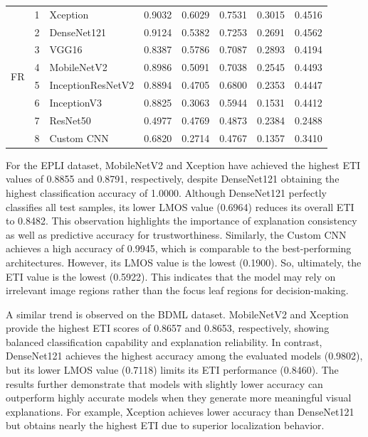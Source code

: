 \documentclass[a4paper,fleqn]{cas-dc}
\begin{document}
\begin{table}[htbp]
{\begin{tabular}{|l|c|l|c|c|c|c|c|}
\multirow{8}{*}{FR}
&1&Xception&0.9032&0.6029&0.7531&0.3015&0.4516\\
&2&DenseNet121&0.9124&0.5382&0.7253&0.2691&0.4562\\
&3&VGG16&0.8387&0.5786&0.7087&0.2893&0.4194\\
&4&MobileNetV2&0.8986&0.5091&0.7038&0.2545&0.4493\\
&5&InceptionResNetV2&0.8894&0.4705&0.6800&0.2353&0.4447\\
&6&InceptionV3&0.8825&0.3063&0.5944&0.1531&0.4412\\
&7&ResNet50&0.4977&0.4769&0.4873&0.2384&0.2488\\
&8&Custom CNN&0.6820&0.2714&0.4767&0.1357&0.3410\\

\hline
\end{tabular}}
\end{table}



For the EPLI dataset, MobileNetV2 and Xception have achieved the highest ETI values of 0.8855 and 0.8791, respectively, despite DenseNet121 obtaining the highest classification accuracy of 1.0000. Although DenseNet121 perfectly classifies all test samples, its lower LMOS value (0.6964) reduces its overall ETI to 0.8482. This observation highlights the importance of explanation consistency as well as predictive accuracy for trustworthiness. Similarly, the Custom CNN achieves a high accuracy of 0.9945, which is comparable to the best-performing architectures. However, its LMOS value is the lowest (0.1900). So, ultimately, the ETI value is the lowest (0.5922). This indicates that the model may rely on irrelevant image regions rather than the focus leaf regions for decision-making.

A similar trend is observed on the BDML dataset. MobileNetV2 and Xception provide the highest ETI scores of 0.8657 and 0.8653, respectively, showing balanced classification capability and explanation reliability. In contrast, DenseNet121 achieves the highest accuracy among the evaluated models (0.9802), but its lower LMOS value (0.7118) limits its ETI performance (0.8460). The results further demonstrate that models with slightly lower accuracy can outperform highly accurate models when they generate more meaningful visual explanations. For example, Xception achieves lower accuracy than DenseNet121 but obtains nearly the highest ETI due to superior localization behavior.
\end{document}
